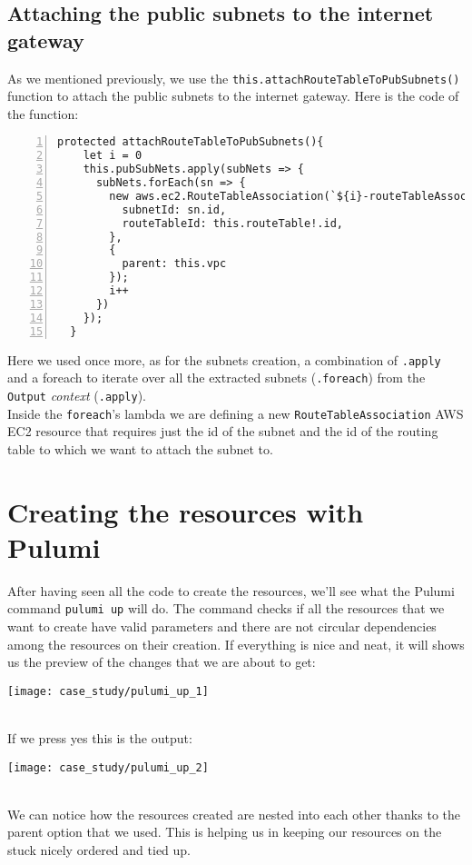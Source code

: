 \subsection{Attaching the public subnets to the internet gateway}
As we mentioned previously, we use the \texttt{this.attachRouteTableToPubSubnets()} function to attach the public subnets to the internet gateway.
Here is the code of the function:\\
\begin{minipage}{\linewidth}
\begin{lstlisting}[numbers=left, numberstyle=\tiny, numbersep=-5pt, stepnumber=1]
  protected attachRouteTableToPubSubnets(){
    let i = 0
    this.pubSubNets.apply(subNets => {
      subNets.forEach(sn => {
        new aws.ec2.RouteTableAssociation(`${i}-routeTableAssociation-typescript`, {
          subnetId: sn.id,
          routeTableId: this.routeTable!.id,
        },
        {
          parent: this.vpc
        });
        i++
      })
    });
  }
\end{lstlisting}
\end{minipage}
Here we used once more, as for the subnets creation, a combination of \texttt{.apply} and a foreach to iterate over all the extracted subnets (\texttt{.foreach}) from the \texttt{Output} \textit{context} (\texttt{.apply}).\\
Inside the \texttt{foreach}'s lambda we are defining a new \texttt{RouteTableAssociation} AWS EC2 resource that requires just the id of the subnet and the id of the routing table to which we want to attach the subnet to.

\section{Creating the resources with Pulumi}
After having seen all the code to create the resources, we'll see what the Pulumi command \texttt{pulumi up} will do.
The command checks if all the resources that we want to create have valid parameters and there are not circular dependencies among the resources on their creation.
If everything is nice and neat, it will shows us the preview of the changes that we are about to get:
\begin{center}
  \texttt{[image: case\_study/pulumi\_up\_1]} 
\end{center}\mbox{}\\

If we press yes this is the output:
\begin{center}
  \texttt{[image: case\_study/pulumi\_up\_2]} 
\end{center}\mbox{}\\
We can notice how the resources created are nested into each other thanks to the parent option that we used.
This is helping us in keeping our resources on the stuck nicely ordered and tied up.\\

